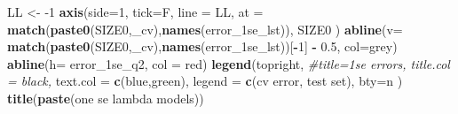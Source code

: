\documentclass[
]{book}
\newenvironment{Shaded}{\begin{snugshade}}{\end{snugshade}}
\newcommand{\CommentTok}[1]{\textcolor[rgb]{0.56,0.35,0.01}{\textit{#1}}}
\newcommand{\DataTypeTok}[1]{\textcolor[rgb]{0.13,0.29,0.53}{#1}}
\newcommand{\DecValTok}[1]{\textcolor[rgb]{0.00,0.00,0.81}{#1}}
\newcommand{\FloatTok}[1]{\textcolor[rgb]{0.00,0.00,0.81}{#1}}
\newcommand{\KeywordTok}[1]{\textcolor[rgb]{0.13,0.29,0.53}{\textbf{#1}}}
\newcommand{\NormalTok}[1]{#1}
\newcommand{\OperatorTok}[1]{\textcolor[rgb]{0.81,0.36,0.00}{\textbf{#1}}}
\newcommand{\StringTok}[1]{\textcolor[rgb]{0.31,0.60,0.02}{#1}}
\begin{document}
\begin{Shaded}
\begin{Highlighting}[]
\NormalTok{LL <{-}}\StringTok{ }\DecValTok{{-}1}
\KeywordTok{axis}\NormalTok{(}\DataTypeTok{side=}\DecValTok{1}\NormalTok{, }\DataTypeTok{tick=}\NormalTok{F, }\DataTypeTok{line =}\NormalTok{ LL,}
  \DataTypeTok{at =} \KeywordTok{match}\NormalTok{(}\KeywordTok{paste0}\NormalTok{(SIZE0,}\StringTok{\textquotesingle{}\_cv\textquotesingle{}}\NormalTok{),}\KeywordTok{names}\NormalTok{(error\_1se\_lst)), }
\NormalTok{  SIZE0}
\NormalTok{ )}
\KeywordTok{abline}\NormalTok{(}\DataTypeTok{v=} \KeywordTok{match}\NormalTok{(}\KeywordTok{paste0}\NormalTok{(SIZE0,}\StringTok{\textquotesingle{}\_cv\textquotesingle{}}\NormalTok{),}\KeywordTok{names}\NormalTok{(error\_1se\_lst))[}\OperatorTok{{-}}\DecValTok{1}\NormalTok{] }\OperatorTok{{-}}\StringTok{ }\FloatTok{0.5}\NormalTok{, }\DataTypeTok{col=}\StringTok{\textquotesingle{}grey\textquotesingle{}}\NormalTok{)}
\KeywordTok{abline}\NormalTok{(}\DataTypeTok{h=}\NormalTok{ error\_1se\_q2, }\DataTypeTok{col =} \StringTok{\textquotesingle{}red\textquotesingle{}}\NormalTok{)}
\KeywordTok{legend}\NormalTok{(}\StringTok{\textquotesingle{}topright\textquotesingle{}}\NormalTok{, }
   \CommentTok{\#title=\textquotesingle{}1se errors\textquotesingle{}, title.col = \textquotesingle{}black\textquotesingle{},}
   \DataTypeTok{text.col =} \KeywordTok{c}\NormalTok{(}\StringTok{\textquotesingle{}blue\textquotesingle{}}\NormalTok{,}\StringTok{\textquotesingle{}green\textquotesingle{}}\NormalTok{),}
   \DataTypeTok{legend =} \KeywordTok{c}\NormalTok{(}\StringTok{\textquotesingle{}cv error\textquotesingle{}}\NormalTok{, }\StringTok{\textquotesingle{}test set\textquotesingle{}}\NormalTok{),}
   \DataTypeTok{bty=}\StringTok{\textquotesingle{}n\textquotesingle{}}
\NormalTok{ )}
\KeywordTok{title}\NormalTok{(}\KeywordTok{paste}\NormalTok{(}\StringTok{\textquotesingle{}one se lambda models\textquotesingle{}}\NormalTok{))}


\end{Highlighting}
\end{Shaded}
\end{document}
